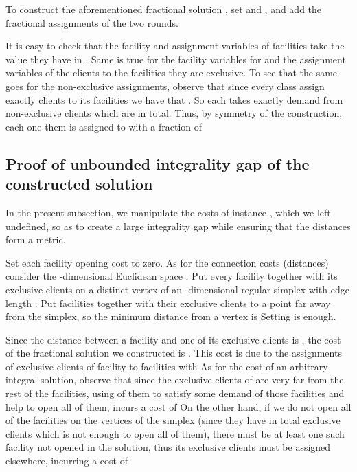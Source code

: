 \documentclass[11pt]{article}\usepackage{amsmath}
\begin{document}
\noindent
To  construct  the   aforementioned  fractional  solution ,  set      and     , and  add the  fractional assignments of  the two
rounds. 

It is easy to check that the facility and assignment variables of facilities 
take the value they have in . Same is true for the facility variables for 
and the assignment variables of the clients to the facilities they are exclusive. 
To see that the same goes for the non-exclusive assignments, observe that since
every class assign exactly  clients to its facilities we have that .
So each  takes exactly  demand from non-exclusive clients which  are
 in total. Thus, by symmetry of the construction, each one them is assigned to 
with a fraction of 

\subsection{Proof of unbounded integrality gap of the constructed solution}

In the  present subsection, we  manipulate the costs of  instance ,
which we left undefined, so as to create a large integrality gap while
ensuring that the distances form a metric.

Set each facility opening cost to zero. As for the connection costs (distances)
consider the -dimensional Euclidean space . Put
every facility    together with its  exclusive clients on a
distinct vertex of an -dimensional regular simplex with edge length
. Put facilities  together with their exclusive clients to a point
far away  from the simplex, so  the minimum distance from  a vertex is
 Setting  is enough.

Since the distance between a facility and one of its exclusive clients
is  ,  the  cost  of  the fractional  solution  we  constructed  is
. This cost  is due to the assignments  of exclusive clients of
facility   to facilities  with   
As  for the cost  of an arbitrary integral  solution, observe
that since the  exclusive  clients of  are very far from
the  rest of  the facilities,  using   of them  to  satisfy some
demand of  those facilities and help  to open all of  them, incurs a
cost of  On the other hand, if we do not open all of the 
facilities on  the vertices of the  simplex (since they  have in total
  exclusive clients  which is  not enough  to open  all of
them), there  must be  at least  one such facility  not opened  in the
solution, thus its  exclusive clients must be assigned elsewhere,
incurring a cost of  
\end{document}

